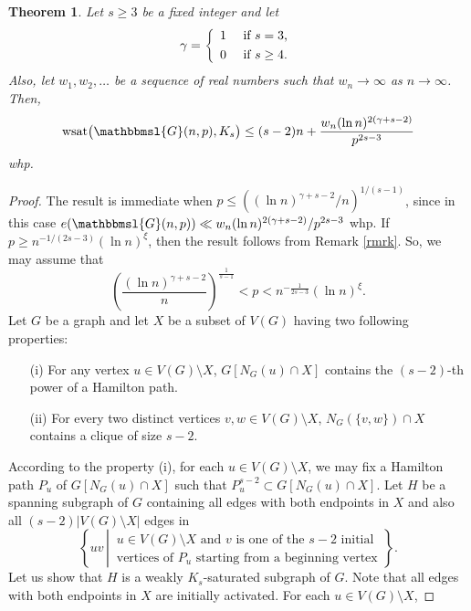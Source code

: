 \documentclass[hidelinks, 11pt]{article}
\theoremstyle{plain}
\newtheorem{theorem}{Theorem}[section]
\theoremstyle{definition}
\begin{document}
\begin{theorem}\label{upperbd}
Let  $s\geq 3$ be  a fixed  integer and let
$$\gamma=\left\{\begin{array}{ll}
1  &   \mbox{ if } s=3\mbox{,}\\\vspace{-3mm}\\
0 &  \mbox{ if } s\geq 4\mbox{.}
\end{array}\right.$$
Also, let  $w_1, w_2, \ldots$ be a sequence of real numbers such that   $w_n\to\infty$ as $n\to\infty$. Then,      $$\mathrm{wsat}\big(\mathbbmsl{G}(n, p), K_s\big)\leq (s-2)n+\frac{w_n(\ln n)^{2(\gamma+s-2)}}{p^{2s-3}}$$ whp.
\end{theorem}



\begin{proof}
The result is immediate when     $p\leq((\ln n)^{\gamma+s-2}/n)^{1/(s-1)}$,   since   in this case  $e(\mathbbmsl{G}(n,p))\ll w_n(\ln n)^{2(\gamma+s-2)}/p^{2s-3}$ whp. If  $p\geq n^{-1/(2s-3)}(\ln n)^\xi$, then   the result follows from Remark \ref{rmrk}. So,  we may assume that
$$\left(\frac{(\ln n)^{\gamma+s-2}}{n}\right)^{\frac{1}{s-1}}<p<n^{-\frac{1}{2s-3}}(\ln n)^\xi.$$
Let $G$ be a graph and let  $X$ be a subset of  $V(G)$ having  two following properties:
\begin{itemize}
\item [(i)] For  any   vertex $u\in V(G)\setminus X$,     $G[N_G(u)\cap X]$  contains the  $(s-2)$-th power of a Hamilton path.
\item [(ii)] For every  two distinct vertices $v,w\in V(G)\setminus X$, $N_G(\{v, w\})\cap X$  contains a clique of size $s-2$.
\end{itemize}
According to  the property (i), for each    $u\in V(G)\setminus X$, we may   fix a     Hamilton  path  $P_u$  of  $G[N_G(u)\cap X]$ such that $P_u^{s-2}\subset G[N_G(u)\cap X]$.
Let	$H$ be a spanning subgraph of $G$ containing all edges with both endpoints in $X$ and also  all $(s-2)|V(G)\setminus X|$   edges in
$$\left\{uv  \, \left| \,
\begin{array}{ll}
\text{$u\in V(G)\setminus X$   and $v$    is one of  the    $s-2$ initial}\\
\text{vertices of $P_u$ starting from  a beginning   vertex}
\end{array}
\right.\right\}.$$
Let us show that $H$ is  a weakly $K_s$-saturated subgraph of  $G$.
Note that all edges with both endpoints in $X$ are initially  activated.
For each $u\in V(G)\setminus X$,

\end{proof}
\end{document}

